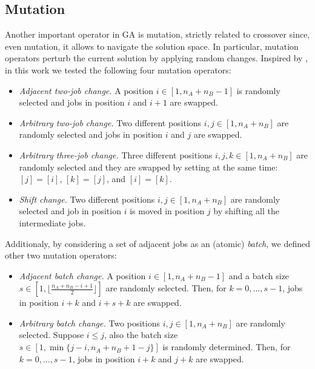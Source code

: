 \documentclass[opre,nonblindrev]{informs3} %
\begin{document}
\subsection{Mutation}
Another important operator in GA is mutation, strictly related to crossover since, even mutation, it allows to navigate the solution space. In particular, mutation operators perturb the current solution by applying random changes.
Inspired by \cite{sched1}, in this work we tested the following four mutation operators:
\begin{itemize}
	\item \textit{Adjacent two-job change.} A position $i \in [1,n_A+n_B-1]$ is randomly selected and jobs in position $i$ and $i+1$ are swapped.
	\item \textit{Arbitrary two-job change.} Two different positions $i,j \in [1,n_A+n_B]$ are randomly selected and jobs in position $i$ and $j$ are swapped.
	\item \textit{Arbitrary three-job change.} Three different positions $i,j,k \in [1,n_A+n_B]$ are randomly selected and they are swapped by setting at the same time: $[j] = [i]$, $[k] = [j]$, and $[i] = [k]$. 
	\item \textit{Shift change.} Two different positions $i,j \in [1,n_A+n_B]$ are randomly selected and job in position $i$ is moved in position $j$ by shifting all the intermediate jobs.
\end{itemize} 
Additionaly, by considering a set of adjacent jobs as an (atomic) \textit{batch}, we defined other two mutation operators:
\begin{itemize}
	\item \textit{Adjacent batch change.} A position $i \in [1,n_A+n_B-1]$ and a batch size $s \in [1,\lfloor{\frac{n_A+n_B-i+1}{2}}\rfloor]$ are randomly selected. Then, for $k=0,\ldots,s-1$, jobs in position $i+k$ and $i+s+k$ are swapped.
	\item \textit{Arbitrary batch change.} Two positions $i,j \in [1,n_A+n_B]$ are randomly selected. Suppose $i\le j$, also the batch size $s \in [1, \min\{j-i,n_A+n_B+1-j\}]$ is randomly determined. Then, for $k=0,\ldots,s-1$, jobs in position $i+k$ and $j+k$ are swapped. 
\end{itemize}
\end{document}
